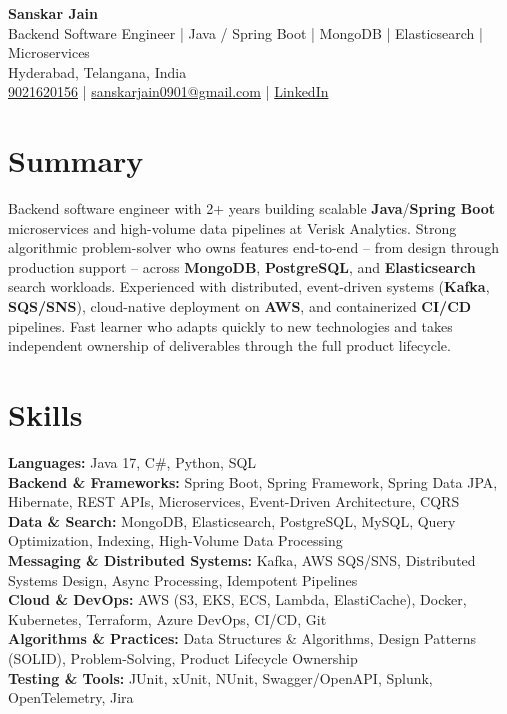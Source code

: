 \documentclass[a4paper,10pt]{article}
\begin{document}
\begin{center}
    {\LARGE \textbf{Sanskar Jain}} \\
    Backend Software Engineer \;|\; Java / Spring Boot \;|\; MongoDB \;|\; Elasticsearch \;|\; Microservices \\
    Hyderabad, Telangana, India \\
    \href{tel:9021620156}{9021620156} \;|\;
    \href{mailto:sanskarjain0901@gmail.com}{sanskarjain0901@gmail.com} \;|\;
    \href{https://www.linkedin.com/in/sanskar-jain0901/}{LinkedIn}
\end{center}

\vspace{3pt}

\section*{Summary}
Backend software engineer with 2+ years building scalable \textbf{Java}/\textbf{Spring Boot} microservices and high-volume data pipelines at Verisk Analytics.
Strong algorithmic problem-solver who owns features end-to-end -- from design through production support -- across \textbf{MongoDB}, \textbf{PostgreSQL}, and \textbf{Elasticsearch} search workloads.
Experienced with distributed, event-driven systems (\textbf{Kafka}, \textbf{SQS/SNS}), cloud-native deployment on \textbf{AWS}, and containerized \textbf{CI/CD} pipelines.
Fast learner who adapts quickly to new technologies and takes independent ownership of deliverables through the full product lifecycle.

\section*{Skills}
\textbf{Languages:} Java 17, C\#, Python, SQL \\
\textbf{Backend \& Frameworks:} Spring Boot, Spring Framework, Spring Data JPA, Hibernate, REST APIs, Microservices, Event-Driven Architecture, CQRS \\
\textbf{Data \& Search:} MongoDB, Elasticsearch, PostgreSQL, MySQL, Query Optimization, Indexing, High-Volume Data Processing \\
\textbf{Messaging \& Distributed Systems:} Kafka, AWS SQS/SNS, Distributed Systems Design, Async Processing, Idempotent Pipelines \\
\textbf{Cloud \& DevOps:} AWS (S3, EKS, ECS, Lambda, ElastiCache), Docker, Kubernetes, Terraform, Azure DevOps, CI/CD, Git \\
\textbf{Algorithms \& Practices:} Data Structures \& Algorithms, Design Patterns (SOLID), Problem-Solving, Product Lifecycle Ownership \\
\textbf{Testing \& Tools:} JUnit, xUnit, NUnit, Swagger/OpenAPI, Splunk, OpenTelemetry, Jira
\end{document}
